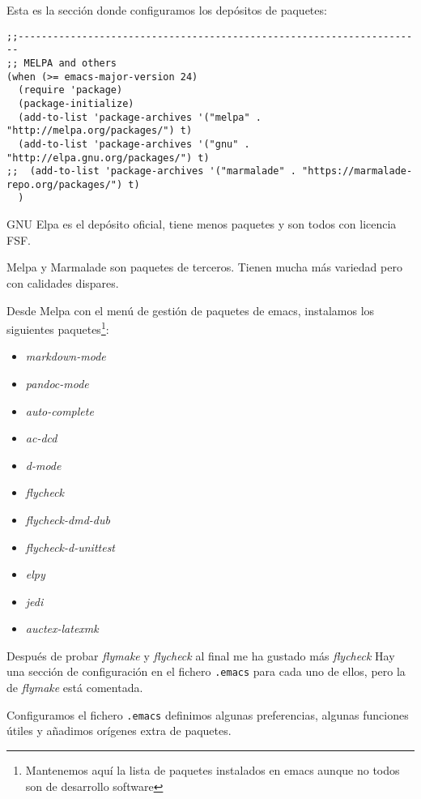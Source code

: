 \documentclass[
  12pt,
  spanish,
]{article}
\providecommand{\tightlist}{%
  \setlength{\itemsep}{0pt}\setlength{\parskip}{0pt}}
\begin{document}
Esta es la sección donde configuramos los depósitos de paquetes:

\begin{verbatim}
;;----------------------------------------------------------------------
;; MELPA and others
(when (>= emacs-major-version 24)
  (require 'package)
  (package-initialize)
  (add-to-list 'package-archives '("melpa" . "http://melpa.org/packages/") t)
  (add-to-list 'package-archives '("gnu" . "http://elpa.gnu.org/packages/") t)
;;  (add-to-list 'package-archives '("marmalade" . "https://marmalade-repo.org/packages/") t)
  )
\end{verbatim}

GNU Elpa es el depósito oficial, tiene menos paquetes y son todos con
licencia FSF.

Melpa y Marmalade son paquetes de terceros. Tienen mucha más variedad
pero con calidades dispares.

Desde Melpa con el menú de gestión de paquetes de emacs, instalamos los
siguientes paquetes\footnote{Mantenemos aquí la lista de paquetes
  instalados en emacs aunque no todos son de desarrollo software}:

\begin{itemize}
\tightlist
\item
  \emph{markdown-mode}
\item
  \emph{pandoc-mode}
\item
  \emph{auto-complete}
\item
  \emph{ac-dcd}
\item
  \emph{d-mode}
\item
  \emph{flycheck}
\item
  \emph{flycheck-dmd-dub}
\item
  \emph{flycheck-d-unittest}
\item
  \emph{elpy}
\item
  \emph{jedi}
\item
  \emph{auctex-latexmk}
\end{itemize}

Después de probar \emph{flymake} y \emph{flycheck} al final me ha
gustado más \emph{flycheck} Hay una sección de configuración en el
fichero \texttt{.emacs} para cada uno de ellos, pero la de
\emph{flymake} está comentada.

Configuramos el fichero \texttt{.emacs} definimos algunas preferencias,
algunas funciones útiles y añadimos orígenes extra de paquetes.
\end{document}
